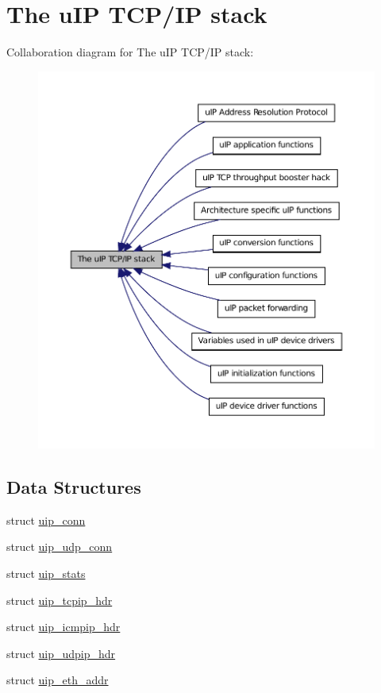 \hypertarget{group__uip}{
\section{The uIP TCP/IP stack}
\label{group__uip}
}


Collaboration diagram for The uIP TCP/IP stack:
\nopagebreak
\begin{figure}[H]
\begin{center}
\leavevmode
\includegraphics[width=400pt]{group__uip}
\end{center}
\end{figure}


\subsection*{Data Structures}
\begin{DoxyCompactItemize}
\item 
struct \hyperlink{structuip__conn}{uip\_\-conn}
\item 
struct \hyperlink{structuip__udp__conn}{uip\_\-udp\_\-conn}
\item 
struct \hyperlink{structuip__stats}{uip\_\-stats}
\item 
struct \hyperlink{structuip__tcpip__hdr}{uip\_\-tcpip\_\-hdr}
\item 
struct \hyperlink{structuip__icmpip__hdr}{uip\_\-icmpip\_\-hdr}
\item 
struct \hyperlink{structuip__udpip__hdr}{uip\_\-udpip\_\-hdr}
\item 
struct \hyperlink{structuip__eth__addr}{uip\_\-eth\_\-addr}
\end{DoxyCompactItemize}

